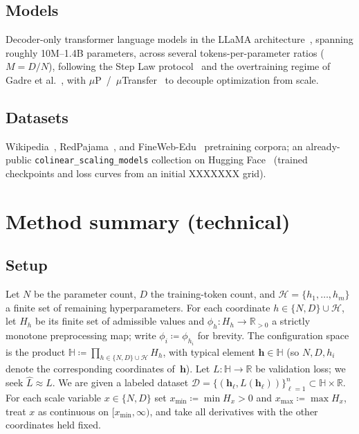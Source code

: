 \documentclass[11pt]{article}
\newcommand{\calD}{\mathcal{D}}
\newcommand{\calH}{\mathcal{H}}
\newcommand{\bbH}{\mathbb{H}}
\newcommand{\bbR}{\mathbb{R}}
\newcommand{\Lhat}{\hat{L}}
\begin{document}
\subsection{Models}\label{sec:models}
Decoder-only transformer language models in the LLaMA architecture~\citep{touvron2023llama}, spanning roughly 10M--1.4B parameters, across several tokens-per-parameter ratios ($M = D/N$), following the Step Law protocol~\citep{li2025steplaw} and the overtraining regime of Gadre et al.~\citep{gadre2024overtraining}, with $\mu$P~/~$\mu$Transfer~\citep{yang2022mup} to decouple optimization from scale.

\subsection{Datasets}\label{sec:datasets}
Wikipedia~\citep{wikimedia2023wikipedia}, RedPajama~\citep{together2023redpajama}, and FineWeb-Edu~\citep{penedo2024finewebedu} pretraining corpora; an already-public \texttt{colinear\_\allowbreak scaling\_\allowbreak models} collection on Hugging Face~\citep{kricheli2025colinear} (trained checkpoints and loss curves from an initial XXXXXXX grid).

\section{Method summary (technical)}\label{sec:method}

\subsection{Setup}\label{sec:setup}
Let $N$ be the parameter count, $D$ the training-token count, and
$\calH = \{h_1, \ldots, h_m\}$ a finite set of remaining hyperparameters.
For each coordinate $h \in \{N, D\} \cup \calH$, let $H_h$ be its finite set of
admissible values and $\phi_h \colon H_h \to \bbR_{>0}$ a strictly monotone
preprocessing map; write $\phi_i \coloneqq \phi_{h_i}$ for brevity.
The configuration space is the product
$\bbH \coloneqq \prod_{h \in \{N,D\}\cup\calH} H_h$,
with typical element $\mathbf{h} \in \bbH$ (so $N, D, h_i$ denote the corresponding
coordinates of~$\mathbf{h}$).
Let $L \colon \bbH \to \bbR$ be validation loss; we seek $\Lhat \approx L$.
We are given a labeled dataset
$\calD = \{(\mathbf{h}_\ell, L(\mathbf{h}_\ell))\}_{\ell=1}^{n} \subset \bbH \times \bbR$.
For each scale variable $x \in \{N, D\}$ set
$x_{\min} \coloneqq \min H_x > 0$ and
$x_{\max} \coloneqq \max H_x$,
treat $x$ as continuous on
$[x_{\min}, \infty)$, and take all derivatives with the other coordinates held fixed.
\end{document}
